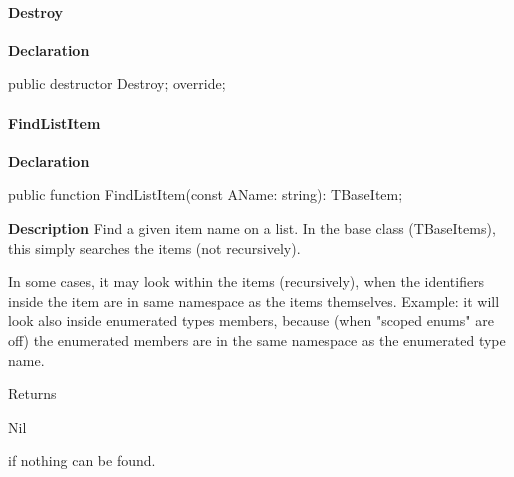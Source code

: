 \documentclass{report}
\newif\ifpdf
\begin{document}
\paragraph*{Destroy}\hspace*{\fill}

\label{PasDoc_Items.TBaseItems-Destroy}
\begin{list}{}{
\setlength{\itemindent}{0cm}
\setlength{\listparindent}{0cm}
\setlength{\leftmargin}{\evensidemargin}
\addtolength{\leftmargin}{\tmplength}
\settowidth{\labelsep}{X}
\addtolength{\leftmargin}{\labelsep}
\setlength{\labelwidth}{\tmplength}
}
\item[\textbf{Declaration}\hfill]
\ifpdf
\begin{flushleft}
\fi
\begin{ttfamily}
public destructor Destroy; override;\end{ttfamily}

\ifpdf
\end{flushleft}
\fi

\end{list}
\paragraph*{FindListItem}\hspace*{\fill}

\label{PasDoc_Items.TBaseItems-FindListItem}
\begin{list}{}{
\setlength{\itemindent}{0cm}
\setlength{\listparindent}{0cm}
\setlength{\leftmargin}{\evensidemargin}
\addtolength{\leftmargin}{\tmplength}
\settowidth{\labelsep}{X}
\addtolength{\leftmargin}{\labelsep}
\setlength{\labelwidth}{\tmplength}
}
\item[\textbf{Declaration}\hfill]
\ifpdf
\begin{flushleft}
\fi
\begin{ttfamily}
public function FindListItem(const AName: string): TBaseItem;\end{ttfamily}

\ifpdf
\end{flushleft}
\fi

\par
\item[\textbf{Description}]
Find a given item name on a list. In the base class (TBaseItems), this simply searches the items (not recursively).

In some cases, it may look within the items (recursively), when the identifiers inside the item are in same namespace as the items themselves. Example: it will look also inside enumerated types members, because (when "scoped enums" are off) the enumerated members are in the same namespace as the enumerated type name.

Returns \begin{ttfamily}Nil\end{ttfamily} if nothing can be found.

\end{list}
\end{document}

